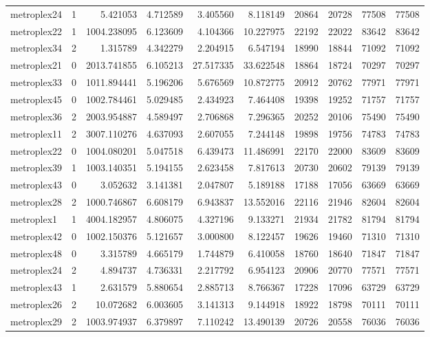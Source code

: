 \begin{longtable}{|l|r|r|r|r|r|r|r|r|r|}
metroplex24 & 1 & 5.421053 & 4.712589 & 3.405560 & 8.118149 & 20864 & 20728 & 77508 & 77508 \\
metroplex22 & 1 & 1004.238095 & 6.123609 & 4.104366 & 10.227975 & 22192 & 22022 & 83642 & 83642 \\
metroplex34 & 2 & 1.315789 & 4.342279 & 2.204915 & 6.547194 & 18990 & 18844 & 71092 & 71092 \\
metroplex21 & 0 & 2013.741855 & 6.105213 & 27.517335 & 33.622548 & 18864 & 18724 & 70297 & 70297 \\
metroplex33 & 0 & 1011.894441 & 5.196206 & 5.676569 & 10.872775 & 20912 & 20762 & 77971 & 77971 \\
metroplex45 & 0 & 1002.784461 & 5.029485 & 2.434923 & 7.464408 & 19398 & 19252 & 71757 & 71757 \\
metroplex36 & 2 & 2003.954887 & 4.589497 & 2.706868 & 7.296365 & 20252 & 20106 & 75490 & 75490 \\
metroplex11 & 2 & 3007.110276 & 4.637093 & 2.607055 & 7.244148 & 19898 & 19756 & 74783 & 74783 \\
metroplex22 & 0 & 1004.080201 & 5.047518 & 6.439473 & 11.486991 & 22170 & 22000 & 83609 & 83609 \\
metroplex39 & 1 & 1003.140351 & 5.194155 & 2.623458 & 7.817613 & 20730 & 20602 & 79139 & 79139 \\
metroplex43 & 0 & 3.052632 & 3.141381 & 2.047807 & 5.189188 & 17188 & 17056 & 63669 & 63669 \\
metroplex28 & 2 & 1000.746867 & 6.608179 & 6.943837 & 13.552016 & 22116 & 21946 & 82604 & 82604 \\
metroplex1 & 1 & 4004.182957 & 4.806075 & 4.327196 & 9.133271 & 21934 & 21782 & 81794 & 81794 \\
metroplex42 & 0 & 1002.150376 & 5.121657 & 3.000800 & 8.122457 & 19626 & 19460 & 71310 & 71310 \\
metroplex48 & 0 & 3.315789 & 4.665179 & 1.744879 & 6.410058 & 18760 & 18640 & 71847 & 71847 \\
metroplex24 & 2 & 4.894737 & 4.736331 & 2.217792 & 6.954123 & 20906 & 20770 & 77571 & 77571 \\
metroplex43 & 1 & 2.631579 & 5.880654 & 2.885713 & 8.766367 & 17228 & 17096 & 63729 & 63729 \\
metroplex26 & 2 & 10.072682 & 6.003605 & 3.141313 & 9.144918 & 18922 & 18798 & 70111 & 70111 \\
metroplex29 & 2 & 1003.974937 & 6.379897 & 7.110242 & 13.490139 & 20726 & 20558 & 76036 & 76036 \\

\end{longtable}
